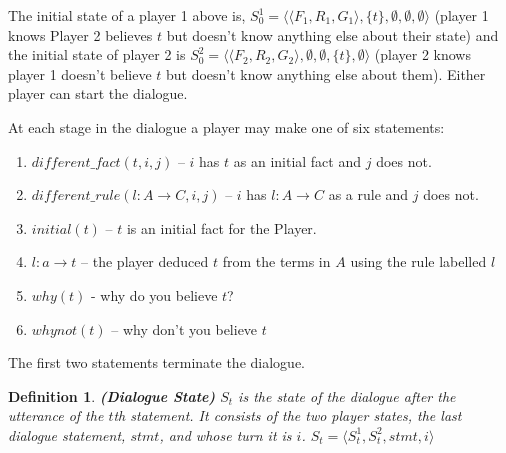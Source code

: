 \documentclass{blue-book}
\newtheorem{definition}{Definition}
\newcommand{\drule}[3]{\ensuremath{#1:#2 \rightarrow #3}}
\begin{document}
The initial state of a player 1 above is, $S^1_0 = \langle \langle F_1, R_1, G_1 \rangle, \{t\}, \emptyset, \emptyset, \emptyset \rangle$ (player 1 knows Player 2 believes $t$ but doesn't know anything else about their state) and the initial state of player 2 is $S^2_0 = \langle \langle F_2, R_2, G_2 \rangle, \emptyset, \emptyset, \{t\}, \emptyset \rangle$ (player 2 knows player 1 doesn't believe $t$ but doesn't know anything else about them).  Either player can start the dialogue.


At each stage in the dialogue a player may make one of six statements:  
\begin{enumerate}
\item $\mathit{different\_fact(t, i, j)}$ -- $i$ has $t$ as an initial fact and $j$ does not.
\item $\mathit{different\_rule(\drule{l}{A}{C}, i, j)}$ -- $i$ has $\drule{l}{A}{C}$ as a rule and $j$ does not.
\item $initial(t)$ -- $t$ is an initial fact for the Player.
\item $\drule{l}{a}{t}$ -- the player deduced $t$ from the terms in $A$ using the rule labelled $l$
\item $why(t)$ - why do you believe $t$?
\item $whynot(t)$ -- why don't you believe $t$
\end{enumerate}
The first two statements terminate the dialogue.

\begin{definition}{\bf (Dialogue State)}
$S_{t}$ is the state of the dialogue after the utterance of the $t$th statement. It consists of the two player states, the last dialogue statement, $stmt$, and whose turn it is $i$.  $S_{t} = \langle S^1_{t}, S^2_{t}, stmt, i \rangle$
\end{definition}
\end{document}
